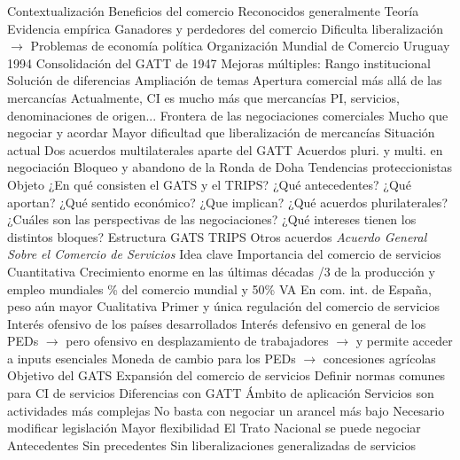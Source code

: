 \documentclass{nuevotema}
\begin{document}
\begin{esquemal}
	\1[] 
		\2 Contextualización
			\3 Beneficios del comercio
				\4 Reconocidos generalmente
				\4[] Teoría
				\4[] Evidencia empírica
				\4 Ganadores y perdedores del comercio
				\4[] Dificulta liberalización
				\4[] $\to$ Problemas de economía política
			\3 Organización Mundial de Comercio
				\4 Uruguay 1994
				\4 Consolidación del GATT de 1947
				\4 Mejoras múltiples:
				\4[] Rango institucional
				\4[] Solución de diferencias
				\4[] Ampliación de temas
			\3 Apertura comercial más allá de las mercancías
				\4 Actualmente, CI es mucho más que mercancías
				\4[] PI, servicios, denominaciones de origen...
				\4 Frontera de las negociaciones comerciales
				\4[] Mucho que negociar y acordar
				\4[] Mayor dificultad que liberalización de mercancías
			\3 Situación actual
				\4 Dos acuerdos multilaterales aparte del GATT
				\4 Acuerdos pluri. y multi. en negociación
				\4 Bloqueo y abandono de la Ronda de Doha
				\4 Tendencias proteccionistas
		\2 Objeto
			\3 ¿En qué consisten el GATS y el TRIPS?
			\3 ¿Qué antecedentes?
			\3 ¿Qué aportan?
			\3 ¿Qué sentido económico?
			\3 ¿Que implican?
			\3 ¿Qué acuerdos plurilaterales?
			\3 ¿Cuáles son las perspectivas de las negociaciones?
			\3 ¿Qué intereses tienen los distintos bloques?
		\2 Estructura
			\3 GATS
			\3 TRIPS
			\3 Otros acuerdos
	\1  \textit{Acuerdo General Sobre el Comercio de Servicios}
		\2 Idea clave
			\3 Importancia del comercio de servicios
				\4 Cuantitativa
				\4[] Crecimiento enorme en las últimas décadas
				/3 de la producción y empleo mundiales
				\% del comercio mundial y 50\% VA
				\4[] En com. int. de España, peso aún mayor
				\4 Cualitativa
				\4[] Primer y única regulación del comercio de servicios
				\4[] Interés ofensivo de los países desarrollados
				\4[] Interés defensivo en general de los PEDs
				\4[] $\to$ pero ofensivo en desplazamiento de trabajadores
				\4[] $\to$ y permite acceder a inputs esenciales
				\4[] Moneda de cambio para los PEDs
				\4[] $\to$ concesiones agrícolas
			\3 Objetivo del GATS
				\4 Expansión del comercio de servicios
				\4 Definir normas comunes para CI de servicios
			\3 Diferencias con GATT
				\4 Ámbito de aplicación
				\4[] Servicios son actividades más complejas
				\4[] No basta con negociar un arancel más bajo
				\4[] Necesario modificar legislación
				\4 Mayor flexibilidad
				\4[] El Trato Nacional se puede negociar
		\2 Antecedentes
			\3 Sin precedentes
				\4 Sin liberalizaciones generalizadas de servicios

\end{esquemal}
\end{document}
